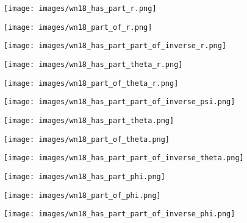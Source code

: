 \documentclass[11pt]{article}
\begin{document}
\begin{figure*}[htbp]
\centering
\begin{minipage}{3.9cm}
\centering
\texttt{[image: images/wn18\_has\_part\_r.png]}
\end{minipage}
\begin{minipage}{3.9cm}
\centering
\texttt{[image: images/wn18\_part\_of\_r.png]}
\end{minipage}
\begin{minipage}{3.9cm}
\centering
\texttt{[image: images/wn18\_has\_part\_part\_of\_inverse\_r.png]}
\end{minipage}


\begin{minipage}{4cm}
\centering
\texttt{[image: images/wn18\_has\_part\_theta\_r.png]}
\end{minipage}\begin{minipage}{4cm}
\centering
\texttt{[image: images/wn18\_part\_of\_theta\_r.png]}
\end{minipage}
\begin{minipage}{4cm}
\centering
\texttt{[image: images/wn18\_has\_part\_part\_of\_inverse\_psi.png]}
\end{minipage}


\begin{minipage}{4cm}
\centering
\texttt{[image: images/wn18\_has\_part\_theta.png]}
\end{minipage}\begin{minipage}{4cm}
\centering
\texttt{[image: images/wn18\_part\_of\_theta.png]}
\end{minipage}
\begin{minipage}{4cm}
\centering
\texttt{[image: images/wn18\_has\_part\_part\_of\_inverse\_theta.png]}
\end{minipage}


\begin{minipage}{4cm}
\centering
\texttt{[image: images/wn18\_has\_part\_phi.png]}
\end{minipage}\begin{minipage}{4cm}
\centering
\texttt{[image: images/wn18\_part\_of\_phi.png]}
\end{minipage}
\begin{minipage}{4cm}
\centering
\texttt{[image: images/wn18\_has\_part\_part\_of\_inverse\_phi.png]}
\end{minipage}



\end{figure*}
\end{document}
